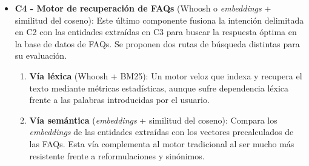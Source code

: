 \documentclass[11pt,a4paper,twoside]{article}
\theoremstyle{definition}
\numberwithin{equation}{section}
\begin{document}
\begin{itemize}
	\item \textbf{C4 - Motor de recuperación de FAQs} (Whoosh o \textit{embeddings} + similitud del coseno): Este último componente fusiona la intención delimitada en C2 con las entidades extraídas en C3 para buscar la respuesta óptima en la base de datos de FAQs. Se proponen dos rutas de búsqueda distintas para su evaluación.
	\begin{enumerate}
		\item \textbf{Vía léxica} (Whoosh + BM25): Un motor veloz que indexa y recupera el texto mediante métricas estadísticas, aunque sufre dependencia léxica frente a las palabras introducidas por el usuario.
		\item \textbf{Vía semántica} (\textit{embeddings} + similitud del coseno): Compara los \textit{embeddings} de las entidades extraídas con los vectores precalculados de las FAQs. Esta vía complementa al motor tradicional al ser mucho más resistente frente a reformulaciones y sinónimos. 
	\end{enumerate}
\end{itemize}

\end{document}
